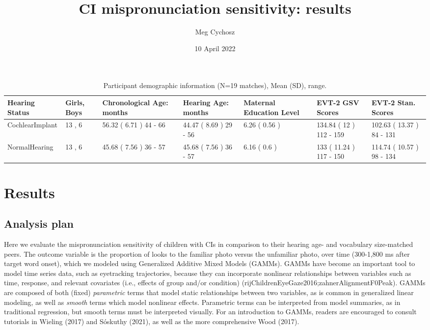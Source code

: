 \documentclass[
]{article}
\title{CI mispronunciation sensitivity: results}
\author{Meg Cychosz}
\date{10 April 2022}
\begin{document}
\maketitle

\begin{table}[!h]

\caption{\label{tab:demo-tab}Participant demographic information (N=19 matches), Mean (SD), range.}
\centering
\begin{tabular}[t]{lllllll}
\toprule
Hearing Status & Girls, Boys & Chronological Age: months & Hearing Age: months & Maternal Education Level & EVT-2 GSV Scores & EVT-2 Stan. Scores\\
\midrule
CochlearImplant & 13 , 6 & 56.32 ( 6.71 ) 44 - 66 & 44.47 ( 8.69 ) 29 - 56 & 6.26 ( 0.56 ) & 134.84 ( 12 ) 112 - 159 & 102.63 ( 13.37 ) 84 - 131\\
NormalHearing & 13 , 6 & 45.68 ( 7.56 ) 36 - 57 & 45.68 ( 7.56 ) 36 - 57 & 6.16 ( 0.6 ) & 133 ( 11.24 ) 117 - 150 & 114.74 ( 10.57 ) 98 - 134\\
\bottomrule
\end{tabular}
\end{table}

\hypertarget{results}{%
\section{Results}\label{results}}

\hypertarget{analysis-plan}{%
\subsection{Analysis plan}\label{analysis-plan}}

Here we evaluate the mispronunciation sensitivity of children with CIs in comparison to their hearing age- and vocabulary size-matched peers. The outcome variable is the proportion of looks to the familiar photo versus the unfamiliar photo, over time (300-1,800 ms after target word onset), which we modeled using Generalized Additive Mixed Models (GAMMs). GAMMs have become an important tool to model time series data, such as eyetracking trajectories, because they can incorporate nonlinear relationships between variables such as time, response, and relevant covariates (i.e., effects of group and/or condition) (rijChildrenEyeGaze2016;zahnerAlignmentF0Peak). GAMMs are composed of both (fixed) \emph{parametric} terms that model static relationships between two variables, as is common in generalized linear modeling, as well as \emph{smooth} terms which model nonlinear effects. Parametric terms can be interpreted from model summaries, as in traditional regression, but smooth terms must be interpreted visually. For an introduction to GAMMs, readers are encouraged to consult tutorials in Wieling (2017) and Sóskuthy (2021), as well as the more comprehensive Wood (2017).
\end{document}
